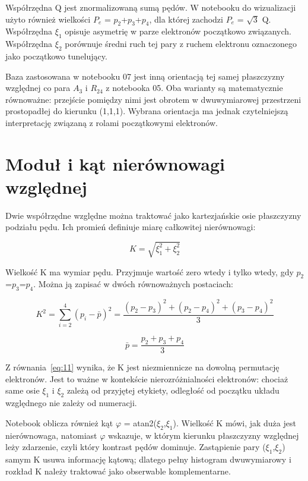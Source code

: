 \documentclass[12pt,letterpaper,oneside]{report}
\numberwithin{equation}{chapter}
\numberwithin{figure}{chapter}
\numberwithin{table}{chapter}
\newcommand{\Pe}{\ensuremath{P_e}}
\begin{document}
Współrzędna Q jest znormalizowaną sumą pędów. W notebooku do
wizualizacji użyto również wielkości \Pe{} = \ensuremath{p_2}+\ensuremath{p_3}+\ensuremath{p_4}, dla której
zachodzi \Pe{} = \ensuremath{\sqrt{3}} Q. Współrzędna \ensuremath{\xi_1} opisuje asymetrię w parze
elektronów początkowo związanych. Współrzędna \ensuremath{\xi_2} porównuje średni ruch
tej pary z ruchem elektronu oznaczonego jako początkowo tunelujący.

Baza zastosowana w notebooku 07 jest inną orientacją tej samej
płaszczyzny względnej co para \ensuremath{A_3} i \ensuremath{R_{24}} z notebooka 05. Oba warianty są
matematycznie równoważne: przejście pomiędzy nimi jest obrotem w
dwuwymiarowej przestrzeni prostopadłej do kierunku (1,1,1). Wybrana
orientacja ma jednak czytelniejszą interpretację związaną z rolami
początkowymi elektronów.

\section{Moduł i kąt nierównowagi względnej}

Dwie współrzędne względne można traktować jako kartezjańskie osie
płaszczyzny podziału pędu. Ich promień definiuje miarę całkowitej
nierównowagi:

\begin{equation}
K=\sqrt{\xi_1^2+\xi_2^2}
\label{eq:10}
\end{equation}

Wielkość K ma wymiar pędu. Przyjmuje wartość zero wtedy i tylko wtedy,
gdy \ensuremath{p_2}=\ensuremath{p_3}=\ensuremath{p_4}. Można ją zapisać w dwóch równoważnych postaciach:

\begin{equation}
K^2=\sum_{i=2}^{4}(p_i-\bar p)^2=\frac{(p_2-p_3)^2+(p_2-p_4)^2+(p_3-p_4)^2}{3}
\label{eq:11}
\end{equation}

\begin{equation}
\bar p=\frac{p_2+p_3+p_4}{3}
\label{eq:12}
\end{equation}

Z równania~\eqref{eq:11} wynika, że K jest niezmiennicze na dowolną permutację
elektronów. Jest to ważne w kontekście nierozróżnialności elektronów:
chociaż same osie \ensuremath{\xi_1} i \ensuremath{\xi_2} zależą od przyjętej etykiety, odległość od
początku układu względnego nie zależy od numeracji.

Notebook oblicza również kąt \ensuremath{\varphi} = atan2(\ensuremath{\xi_2},\ensuremath{\xi_1}). Wielkość K mówi, jak duża
jest nierównowaga, natomiast \ensuremath{\varphi} wskazuje, w którym kierunku płaszczyzny
względnej leży zdarzenie, czyli który kontrast pędów dominuje.
Zastąpienie pary (\ensuremath{\xi_1},\ensuremath{\xi_2}) samym K usuwa informację kątową; dlatego pełny
histogram dwuwymiarowy i rozkład K należy traktować jako obserwable
komplementarne.
\end{document}
